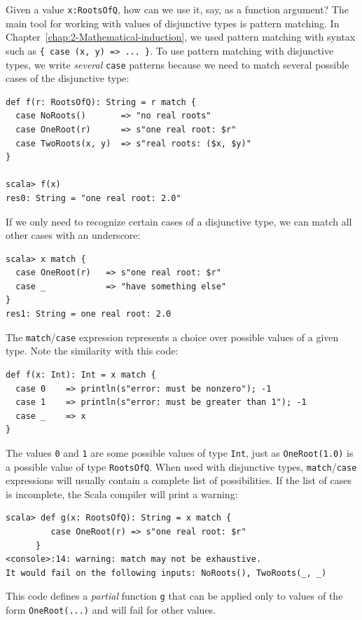 Given a value \lstinline!x:RootsOfQ!, how can we use it, say, as
a function argument? The main tool for working with values of disjunctive
types is pattern matching. In Chapter~\ref{chap:2-Mathematical-induction},
we used pattern matching with syntax such as \lstinline!{ case (x, y) => ... }!.
To use pattern matching with disjunctive types, we write \emph{several}
\lstinline!case! patterns because we need to match several possible
cases of the disjunctive type:
\begin{lstlisting}
def f(r: RootsOfQ): String = r match {
  case NoRoots()       => "no real roots"
  case OneRoot(r)      => s"one real root: $r"
  case TwoRoots(x, y)  => s"real roots: ($x, $y)"
}

scala> f(x)
res0: String = "one real root: 2.0"
\end{lstlisting}
If we only need to recognize certain cases of a disjunctive type,
we can match all other cases with an underscore:
\begin{lstlisting}
scala> x match {
  case OneRoot(r)   => s"one real root: $r"
  case _            => "have something else"
}
res1: String = one real root: 2.0
\end{lstlisting}
The \lstinline!match!/\lstinline!case! expression represents a choice
over possible values of a given type. Note the similarity with this
code:

\begin{lstlisting}
def f(x: Int): Int = x match {
  case 0    => println(s"error: must be nonzero"); -1
  case 1    => println(s"error: must be greater than 1"); -1
  case _    => x
}
\end{lstlisting}
The values \lstinline!0! and \lstinline!1! are some possible values
of type \lstinline!Int!, just as \lstinline!OneRoot(1.0)! is a possible
value of type \lstinline!RootsOfQ!. When used with disjunctive types,
\lstinline!match!/\lstinline!case! expressions will usually contain
a complete list of possibilities. If the list of cases is incomplete,
the Scala compiler will print a warning:
\begin{lstlisting}
scala> def g(x: RootsOfQ): String = x match {
         case OneRoot(r) => s"one real root: $r"
      }
<console>:14: warning: match may not be exhaustive.
It would fail on the following inputs: NoRoots(), TwoRoots(_, _)
\end{lstlisting}
This code defines a \emph{partial} function
\lstinline!g! that can be applied only to values of the form \lstinline!OneRoot(...)!
and will fail for other values.


